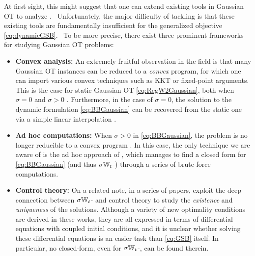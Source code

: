At first sight, this might suggest that one can extend existing tools in Gaussian \acrshort{OT} to analyze .%
~Unfortunately, the major difficulty of tackling  is that these existing tools are fundamentally insufficient for the generalized objective \eqref{eq:dynamicGSB}. 
~To be more precise, there exist three prominent frameworks for studying Gaussian \acrshort{OT} problems: %
\begin{itemize}[leftmargin=.4cm,itemsep=.0cm,topsep=.0cm]
\item \textbf{Convex analysis:} An extremely fruitful observation in the field is that many Gaussian \acrshort{OT} instances can be reduced to a \emph{convex} program, for which one can import various convex techniques such as \acrfull{KKT} or fixed-point arguments. This is the case for static Gaussian \acrshort{OT} \eqref{eq:RegW2Gaussian}, both when $\sigma = 0$ \citep{dowson1982frechet, olkin1982distance, bhatia2019bures} and $\sigma>0$ \citep{janati2020entropic}. Furthermore, in the case of $\sigma=0$, the solution to the dynamic formulation \eqref{eq:BBGaussian} can be recovered from the static one via a simple linear interpolation \citep{mccann1997convexity}.

\item \textbf{Ad hoc computations:} When $\sigma>0$ in \eqref{eq:BBGaussian}, the problem is no longer reducible to a convex program \citep{leonard2013survey, chen2021stochastic}. In this case, the only technique we are aware of is the ad hoc approach of \citep{mallasto2021entropy}, which manages to find a closed form for \eqref{eq:BBGaussian} (and thus $\sigma\mathbb{W}_{t}$-) through a series of brute-force computations.

\item \textbf{Control theory:} On a related note, in a series of papers, \citet{chen2015optimal,chen2016relation,chen2018optimal} exploit the deep connection between $\sigma\mathbb{W}_{t}$- and control theory to study the \emph{existence} and \emph{uniqueness} of the solutions. Although a variety of new optimality conditions are derived in these works, they are all expressed in terms of differential equations with coupled initial conditions, and it is unclear whether solving these differential equations is an easier task than \eqref{eq:GSB} itself. In particular, no closed-form, even for $\sigma\mathbb{W}_{t}$-, can be found therein. \\
\end{itemize}


